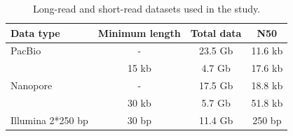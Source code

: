 \begin{table}[ht]
\centering
\caption{Long-read and short-read datasets used in the study.}
\begin{tabular}{lccc}
\hline
\textbf{Data type} & \textbf{Minimum length} & \textbf{Total data} & \textbf{N50} \\
\hline
PacBio & - & 23.5 Gb & 11.6 kb \\
& 15 kb & 4.7 Gb & 17.6 kb \\
\hline
Nanopore & - & 17.5 Gb & 18.8 kb  \\
& 30 kb & 5.7 Gb & 51.8 kb  \\
\hline
Illumina 2*250 bp & 30 bp & 11.4 Gb & 250 bp \\
\hline
\end{tabular}
\label{tab:datasets}
\end{table}